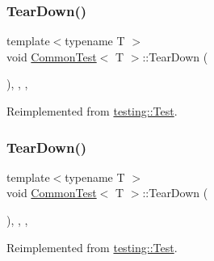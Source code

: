 \mbox{\label{class_common_test_a5e851b64ff1f73cb79b4dbd1d39fd075}} 
\subsubsection{\texorpdfstring{TearDown()}{TearDown()}\hspace{0.1cm}{\footnotesize\ttfamily [1/3]}}
{\footnotesize\ttfamily template$<$typename T $>$ \\
void \mbox{\hyperlink{class_common_test}{Common\+Test}}$<$ T $>$\+::Tear\+Down (\begin{DoxyParamCaption}{ }\end{DoxyParamCaption})\hspace{0.3cm}{\ttfamily [inline]}, {\ttfamily [override]}, {\ttfamily [protected]}, {\ttfamily [virtual]}}



Reimplemented from \mbox{\hyperlink{classtesting_1_1_test_a5f0ab439802cbe0ef7552f1a9f791923}{testing\+::\+Test}}.

\mbox{\label{class_common_test_a5e851b64ff1f73cb79b4dbd1d39fd075}} 
\subsubsection{\texorpdfstring{TearDown()}{TearDown()}\hspace{0.1cm}{\footnotesize\ttfamily [2/3]}}
{\footnotesize\ttfamily template$<$typename T $>$ \\
void \mbox{\hyperlink{class_common_test}{Common\+Test}}$<$ T $>$\+::Tear\+Down (\begin{DoxyParamCaption}{ }\end{DoxyParamCaption})\hspace{0.3cm}{\ttfamily [inline]}, {\ttfamily [override]}, {\ttfamily [protected]}, {\ttfamily [virtual]}}



Reimplemented from \mbox{\hyperlink{classtesting_1_1_test_a5f0ab439802cbe0ef7552f1a9f791923}{testing\+::\+Test}}.

\mbox{\label{class_common_test_aeae195c2cefa956c6ae5be1226e6ecd8}} 
